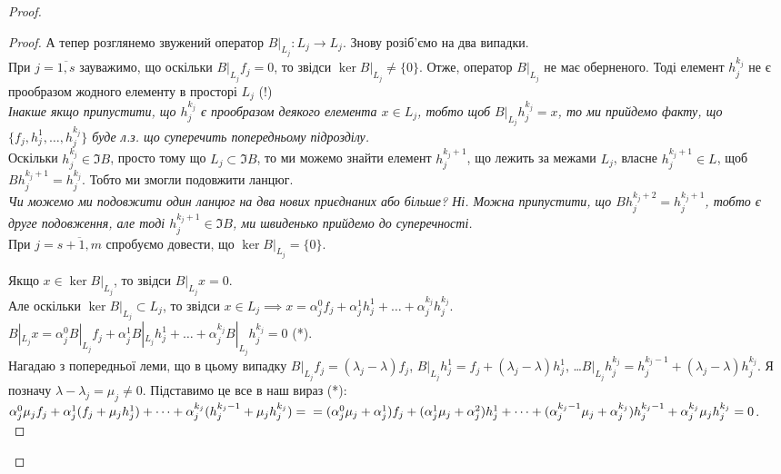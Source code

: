 \begin{proof}
\begin{proof}
А тепер розглянемо звужений оператор $B|_{L_j}: L_j \to L_j$. Знову розіб'ємо на два випадки.\\
При $j=\overline{1,s}$ зауважимо, що оскільки $B|_{L_j}f_j = 0$, то звідси $\ker B|_{L_j} \neq \{0\}$. Отже, оператор $B|_{L_j}$ не має оберненого. Тоді елемент $h_j^{k_j}$ не є прообразом жодного елементу в просторі $L_j$ (!)\\
\textit{Інакше якщо припустити, що $h_j^{k_j}$ є прообразом деякого елемента $x \in L_j$, тобто щоб $B|_{L_j}h_j^{k_j} = x$, то ми прийдемо факту, що $\{f_j,h_j^1,\dots,h_j^{k_j}\}$ буде л.з. що суперечить попередньому підрозділу.}\\
Оскільки $h_j^{k_j} \in \Im B$, просто тому що $L_j \subset \Im B$, то ми можемо знайти елемент $h_j^{k_j+1}$, що лежить за межами $L_j$, власне $h_j^{k_j+1} \in L$, щоб $Bh_j^{k_j+1} = h_j^{k_j}$. Тобто ми змогли подовжити ланцюг.\\
\textit{Чи можемо ми подовжити один ланцюг на два нових приєднаних або більше? Ні. Можна припустити, що $Bh_j^{k_j+2} = h_j^{k_j+1}$, тобто є друге подовження, але тоді $h_j^{k_j+1} \in \Im B$, ми швиденько прийдемо до суперечності.}
\bigskip \\
При $j=\overline{s+1,m}$ спробуємо довести, що $\ker B|_{L_j} = \{0\}$.

Якщо $x \in \ker B|_{L_j}$, то звідси $B|_{L_j}x = 0$.\\
Але оскільки $\ker B|_{L_j} \subset L_j$, то звідси $x \in L_j \implies x = \alpha_j^0 f_j + \alpha_j^1 h_j^1 + \dots + \alpha_j^{k_j}h_j^{k_j}$.\\
$B|_{L_j}x = \alpha_j^0 B|_{L_j}f_j + \alpha_j^1 B|_{L_j}h_j^1 + \dots + \alpha_j^{k_j} B|_{L_j}h_j^{k_j} = 0$ (*).\\
Нагадаю з попередньої леми, що в цьому випадку $B|_{L_j}f_j = (\lambda_j-\lambda)f_j$, $B|_{L_j}h_j^1 = f_j + (\lambda_j - \lambda)h_j^1$, \dots $B|_{L_j}h_j^{k_j} = h_j^{k_j-1} + (\lambda_j - \lambda)h_j^{k_j}$. Я позначу $\lambda-\lambda_j = \mu_j \neq 0$. Підставимо це все в наш вираз (*):
$\alpha_j^0 \mu_j f_j + \alpha_j^1 (f_j+\mu_j h_j^1) + \dots + \alpha_j^{k_j} (h_j^{k_j-1}+\mu_j h_j^{k_j}) = \\ =(\alpha_j^0 \mu_j + \alpha_j^1) f_j + (\alpha_j^1 \mu_j + \alpha_j^2) h_j^1 + \dots + (\alpha_j^{k_j-1}\mu_j + \alpha_j^{k_j})h_j^{k_j-1} + \alpha_j^{k_j} \mu_j h_j^{k_j} = 0$.\\

\end{proof}
\end{proof}

